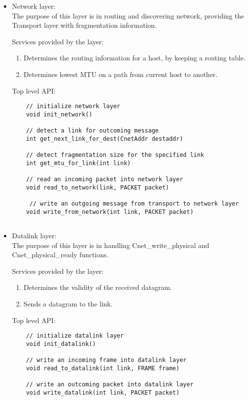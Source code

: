 \documentclass{article}
\begin{document}
\begin{itemize}
		
\item Network layer: \\
		The purpose of this layer is in routing and discovering network, providing the
		Transport layer with fragmentation information.
		
		Services provided by the layer:
    \begin{enumerate}
      \item Determines the routing information for a host, by keeping a routing
      table.
      \item Determines lowest MTU on a path from current host to another.
    \end{enumerate}
		
    Top level API:
		
  \begin{verbatim}
    // initialize network layer
    void init_network()	
   		
    // detect a link for outcoming message
    int get_next_link_for_dest(CnetAddr destaddr)
		
    // detect fragmentation size for the specified link
    int get_mtu_for_link(int link) 
		
    // read an incoming packet into network layer
    void read_to_network(link, PACKET packet)
    
     // write an outgoing message from transport to network layer
    void write_from_network(int link, PACKET packet)
    
  \end{verbatim}
		

\item	Datalink layer: \\
		The purpose of this layer is in handling Cnet\_write\_physical and
		Cnet\_physical\_ready functions. 
		
		Services provided by the layer:
    \begin{enumerate}
      \item Determines the validity of the received datagram.
      \item Sends a datagram to the link.
    \end{enumerate}
		
		Top level API:

  \begin{verbatim}
    // initialize datalink layer
    void init_datalink()
    
    // write an incoming frame into datalink layer
    void read_to_datalink(int link, FRAME frame)
		
    // write an outcoming packet into datalink layer
    void write_datalink(int link, PACKET packet)
  \end{verbatim}

\end{itemize}
\end{document}
